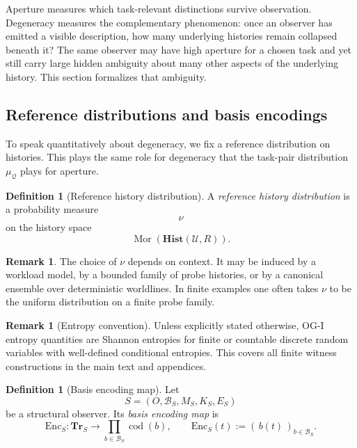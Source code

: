 \documentclass[11pt,twoside]{article}
\theoremstyle{definition}
\newtheorem{definition}[theorem]{Definition}
\newtheorem{remark}[theorem]{Remark}
\newcommand{\Hist}{\mathbf{Hist}}
\newcommand{\Tr}{\mathbf{Tr}}
\newcommand{\Enc}{\mathrm{Enc}}
\DeclareMathOperator{\Mor}{Mor}
\DeclareMathOperator{\cod}{cod}
\begin{document}
Aperture measures which task-relevant distinctions survive observation. Degeneracy measures the complementary phenomenon: once an observer has emitted a visible description, how many underlying histories remain collapsed beneath it? The same observer may have high aperture for a chosen task and yet still carry large hidden ambiguity about many other aspects of the underlying history. This section formalizes that ambiguity.

\subsection{Reference distributions and basis encodings}
\label{subsec:reference-distributions}

To speak quantitatively about degeneracy, we fix a reference distribution on histories. This plays the same role for degeneracy that the task-pair distribution \(\mu_{\mathcal{Q}}\) plays for aperture.

\begin{definition}[Reference history distribution]
\label{def:reference-history-distribution}
A \emph{reference history distribution} is a probability measure
\[
  \nu
\]
on the history space
\[
  \Mor(\Hist(\mathcal{U},R)).
\]
\end{definition}

\begin{remark}
\label{rem:reference-distribution}
The choice of \(\nu\) depends on context. It may be induced by a workload model, by a bounded family of probe histories, or by a canonical ensemble over deterministic worldlines. In finite examples one often takes \(\nu\) to be the uniform distribution on a finite probe family.
\end{remark}

\begin{remark}[Entropy convention]
\label{rem:entropy-convention}
Unless explicitly stated otherwise, OG-I entropy quantities are Shannon entropies for finite or countable discrete random variables with well-defined conditional entropies. This covers all finite witness constructions in the main text and appendices.
\end{remark}

\begin{definition}[Basis encoding map]
\label{def:basis-encoding-map}
Let
\[
  S=(O,\mathcal{B}_S,M_S,K_S,E_S)
\]
be a structural observer. Its \emph{basis encoding map} is
\[
  \Enc_S : \Tr_S \to \prod_{b\in\mathcal{B}_S}\cod(b),
  \qquad
  \Enc_S(t) := (\,b(t)\,)_{b\in\mathcal{B}_S}.
\]
\end{definition}
\end{document}
